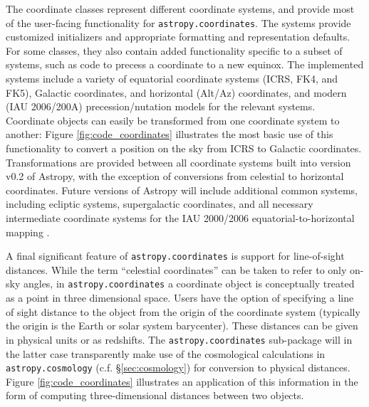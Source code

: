 \documentclass[traditabstract]{aa}
\begin{document}
The coordinate classes represent different coordinate systems, and provide most
of the user-facing functionality for \texttt{astropy.coordinates}. The systems
provide customized initializers and appropriate formatting and representation
defaults. For some classes, they also contain added functionality specific to a
subset of systems, such as code to precess a coordinate to a new equinox. The
implemented systems include a variety of equatorial coordinate systems (ICRS,
FK4, and FK5), Galactic coordinates, and horizontal (Alt/Az) coordinates, and
modern (IAU 2006/200A) precession/nutation models for the relevant systems.
Coordinate objects can easily be transformed from one coordinate system to another: Figure \ref{fig:code_coordinates}
illustrates the most basic use of this functionality to convert a position on the sky from ICRS to
Galactic coordinates. Transformations are provided between all coordinate
systems built into version v0.2 of Astropy, with the exception of conversions
from celestial to horizontal coordinates. Future versions of Astropy will
include additional common systems, including
ecliptic systems, supergalactic coordinates, and all necessary intermediate
coordinate systems for the IAU 2000/2006 equatorial-to-horizontal mapping
\citep[e.g.,][]{soffel03, usnocircular179}.

A final significant feature of \texttt{astropy.coordinates} is support for
line-of-sight distances. While the term ``celestial coordinates'' can be taken
to refer to only on-sky angles, in \texttt{astropy.coordinates} a coordinate
object is conceptually treated as a point in three dimensional space. Users
have the option of specifying a line of sight distance to the object from the
origin of the coordinate system (typically the origin is the Earth or solar
system barycenter). These distances can be given in physical units or as
redshifts. The \texttt{astropy.coordinates} sub-package will in the latter case
transparently make use of the cosmological calculations in
\texttt{astropy.cosmology} (c.f. \S\ref{sec:cosmology}) for conversion to
physical distances. Figure \ref{fig:code_coordinates} illustrates an
application of this information in the form of computing three-dimensional
distances between two objects.
\end{document}
